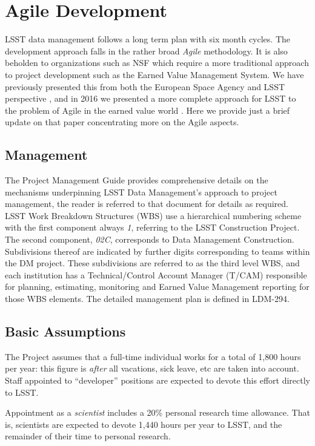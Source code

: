 \section{Agile Development}\label{sec:agile}

LSST data management follows a long term plan with six month cycles. The  development approach falls in the rather broad \emph{Agile} methodology.
It is also beholden to organizations such as NSF which require a more traditional approach to project development such as the Earned Value Management System.
We have previously presented this from both the European Space Agency and LSST perspective \cite{2014SPIE.9150E..1EG}, and in 2016 we presented a more complete approach for LSST to the problem of Agile in the earned value world \cite{2016SPIE.9911E..0NK}.
Here we provide just a brief update on that paper concentrating more on the Agile aspects.


\subsection{Management}
The Project Management Guide \cite{DMTN-020} provides  comprehensive details on the mechanisms underpinning LSST Data Management’s approach to project management, the reader is referred to that document for details as required.
LSST Work Breakdown Structures (WBS) use a hierarchical numbering scheme with the first component always \emph{1}, referring to the LSST Construction Project.
The second component, \emph{02C}, corresponds to Data Management Construction.
Subdivisions thereof are indicated by further digits corresponding to teams within the DM project.
These subdivisions are referred to as the third level WBS, and each institution has a Technical/Control Account Manager (T/CAM) responsible for planning, estimating, monitoring and Earned Value Management reporting for those WBS elements.
The detailed management plan is defined in LDM-294\cite{LDM-294}.

\subsection{Basic Assumptions}
The Project assumes that a full-time individual works for a total of
1,800 hours per year: this figure is \emph{after} all vacations, sick
leave, etc are taken into account. Staff appointed to ``developer''
positions are expected to devote this effort directly to LSST.

Appointment as a \emph{scientist} includes a 20\% personal research time
allowance. That is, scientists are expected to devote 1,440 hours per
year to LSST, and the remainder of their time to personal research.

